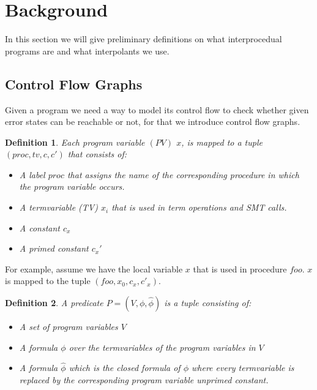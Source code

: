 \documentclass{article}
\newtheorem{mydef}{Definition}
\begin{document}
	\section{Background}
	In this section we will give preliminary definitions on what interprocedual programs are and what interpolants we use.
	
    
    \newcommand{\tf}{\ensuremath{\varphi}\xspace}
    \newcommand{\ctf}{\ensuremath{\widehat{\varphi}}\xspace}
    \newcommand{\invars}{\ensuremath{In}\xspace}
    \newcommand{\outvars}{\ensuremath{Out}\xspace}
    \newcommand{\auxvars}{\ensuremath{Aux}\xspace}
	
	\subsection{Control Flow Graphs}	
	Given a program we need a way to model its control flow to check whether given error states can be reachable or not, for that we introduce control flow graphs.
	
	\begin{mydef}
	Each program variable $(PV)$ $x$, is mapped to a tuple $(proc, tv, c, c')$ that consists of: 
		\begin{itemize}
			\item A label $proc$ that assigns the name of the corresponding procedure in which the program variable occurs. 
			\item A termvariable (TV) $x_i$ that is used in term operations and SMT calls.
			\item A constant $c_x$
			\item A primed constant $c_x'$
		\end{itemize}
	\end{mydef}
	For example, assume we have the local variable $x$ that is used in procedure $foo$. $x$ is mapped to the tuple $(foo, x_0, c_x, c'_x)$. 
	
	\begin{mydef}
		A predicate $P = (V, \phi, \widehat{\phi})$ is a tuple consisting of: 
		\begin{itemize}
			\item A set of program variables $V$
			\item A formula $\phi$ over the termvariables of the program variables in $V$
			\item A formula $\widehat{\phi}$ which is the closed formula of $\phi$ where every termvariable is replaced by the corresponding program variable unprimed constant.
		\end{itemize}
	\end{mydef}
	
\end{document}
